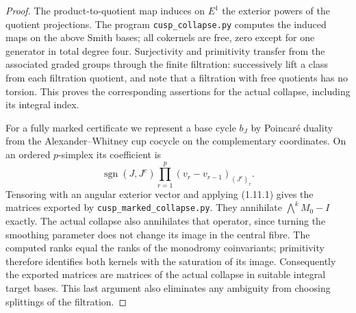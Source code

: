 \begin{proof}
The product-to-quotient map induces on $E^1$ the exterior powers of
the quotient projections.  The program \texttt{cusp\_collapse.py}
computes the induced maps on the above Smith bases; all cokernels are
free, zero except for one generator in total degree four.
Surjectivity and primitivity transfer from the associated graded
groups through the finite filtration: successively lift a class from
each filtration quotient, and note that a filtration with free
quotients has no torsion.  This proves the corresponding assertions
for the actual collapse, including its integral index.

For a fully marked certificate we represent a base cycle $b_J$ by
Poincar\'e duality from the Alexander--Whitney cup cocycle on the
complementary coordinates.  On an ordered $p$-simplex its coefficient
is
\[
\operatorname{sgn}(J,J^c)
 \prod_{r=1}^p(v_r-v_{r-1})_{(J^c)_r}.
\]
Tensoring with an angular exterior vector and applying (1.11.1)
gives the matrices exported by \texttt{cusp\_marked\_collapse.py}.
They annihilate $\bigwedge^kM_0-I$ exactly.  The actual collapse also
annihilates that operator, since turning the smoothing parameter
does not change its image in the central fibre.  The computed ranks
equal the ranks of the monodromy coinvariants; primitivity therefore
identifies both kernels with the saturation of its image.
Consequently the exported matrices are matrices of the actual
collapse in suitable integral target bases.  This last argument also
eliminates any ambiguity from choosing splittings of the filtration.
\end{proof}

